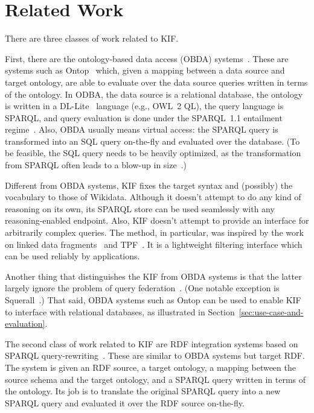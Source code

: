 \section{Related Work}%
\label{sec:related-work}


There are three classes of work related to KIF\@.




First, there are the ontology-based data access (OBDA) systems~\cite{Xiao-G-2018}.
These are systems such as Ontop~\cite{Xiao-G-2020} which, given a mapping between a data source and target ontology, are able to evaluate over the data source queries written in terms of the ontology.
In ODBA, the data source is a relational database, the ontology is written in a DL-Lite~\cite{Calvanese-D-2007} language (e.g., OWL~2 QL), the query language is SPARQL, and query evaluation is done under the SPARQL~1.1 entailment regime~\cite{Xiao-G-2018}.
Also, OBDA usually means virtual access: the SPARQL query is transformed into an SQL query on-the-fly and evaluated over the database.
(To be feasible, the SQL query needs to be heavily optimized, as the transformation from SPARQL often leads to a blow-up in size~\cite{Gu-Z-2022}.)


Different from OBDA systems, KIF fixes the target syntax and (possibly) the vocabulary to those of Wikidata.
Although it doesn't attempt to do any kind of reasoning on its own, its SPARQL store can be used seamlessly with any reasoning-enabled endpoint.
Also, KIF doesn't attempt to provide an interface for arbitrarily complex queries.
The  method, in particular, was inspired by the work on linked data fragments~\cite{Verborgh-R-2014} and TPF~\cite{Verborgh-R-2016}.
It is a lightweight filtering interface which can be used reliably by applications.


Another thing that distinguishes the KIF from OBDA systems is that the latter largely ignore the problem of query federation~\cite{Gu-Z-2022}.
(One notable exception is Squerall~\cite{Mami-M-N-2019}.)
That said, OBDA systems such as Ontop can be used to enable KIF to interface with relational databases, as illustrated in Section~\ref{sec:use-case-and-evaluation}.




The second class of work related to KIF are RDF integration systems based on SPARQL query-rewriting~\cite{Correndo-G-2010,Makris-K-2012}.
These are similar to OBDA systems but target RDF\@.
The system is given an RDF source, a target ontology, a mapping between the source schema and the target ontology, and a SPARQL query written in terms of the ontology.
Its job is to translate the original SPARQL query into a new SPARQL query and evaluated it over the RDF source on-the-fly.


